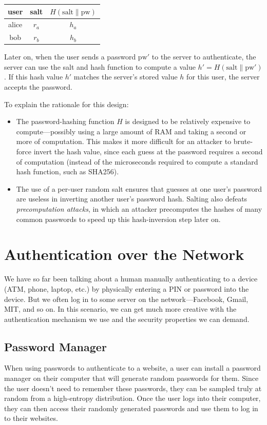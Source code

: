 \medskip
\begin{tabular}{c|c|c}
  user & salt & $H(\text{salt}\|\text{pw})$ \\
	\hline
	alice & $r_a$ & $h_a$ \\
	bob & $r_b$ & $h_b$ \\
\end{tabular}
\medskip

Later on, when the user sends a password $\text{pw}'$ to the server to authenticate, 
the server can use the salt and hash function to compute a value $h' = H(\text{salt}\|\text{pw}')$.
If this hash value $h'$ matches the server's stored value $h$ for this user,
the server accepts the password.

To explain the rationale for this design:
\begin{itemize}
  \item The password-hashing function $H$ is designed to be relatively expensive
        to compute---possibly using a large amount of RAM and taking a second or 
        more of computation.
        This makes it more difficult for an attacker to brute-force invert the
        hash value, since each guess at the password requires a second of computation
        (instead of the microseconds required to compute a standard hash function,
        such as SHA256).
  \item The use of a per-user random salt ensures that guesses at one user's password
        are useless in inverting another user's password hash.
        Salting also defeats \emph{precomputation attacks}, in which an attacker
        precomputes the hashes of many common passwords to speed up this hash-inversion
        step later on.
\end{itemize}


\section{Authentication over the Network}
We have so far been talking about a human manually
authenticating to a device (ATM, phone, laptop, etc.)
by physically entering a PIN or password into the device.
But we often log in to some server on the network---Facebook,
Gmail, MIT, and so on. 
In this scenario, we can get much more creative
with the authentication mechanism we use and the
security properties we can demand.

\subsection{Password Manager}
When using passwords to authenticate to a website, 
a user can install a password manager on their
computer that will generate random passwords for them.
Since the user doesn't need to remember these passwords,
they can be sampled truly at random from a high-entropy distribution.
Once the user logs into their computer, they can
then access their randomly generated passwords and
use them to log in to their websites. 

